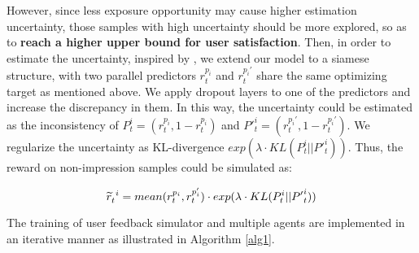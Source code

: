 However, since less exposure opportunity may cause higher estimation uncertainty, those samples with high uncertainty should be more explored, so as to \textbf{reach a higher upper bound for user satisfaction}. 
Then, in order to estimate the uncertainty, inspired by \cite{rnd2018}, we extend our model to a siamese structure, with two parallel predictors $r_t^{p_i}$ and $r_t^{p_i'}$ share the same optimizing target as mentioned above. We apply dropout layers to one of the predictors and increase the discrepancy in them. In this way, the uncertainty could be estimated as the inconsistency of $P_{t}^i = (r_t^{p_i}, 1- r_t^{p_i})$ and ${P'}_{t}^i = (r_t^{p_i'}, 1-r_t^{p_i'})$. We regularize the uncertainty as KL-divergence $exp(\lambda \cdot KL(P_{t}^i||{P'}_{t}^i))$. Thus, the reward on non-impression samples could be simulated as:



\vspace{-1.0em}
\begin{small}
\begin{equation} \label{eq6}
\setlength{\abovedisplayskip}{1pt}
\widetilde{r}_t^{\ i} = mean(r_t^{p_i}, r_t^{p_i'}) \cdot exp(\lambda \cdot KL(P_{t}^i||{P'}_{t}^i))
\setlength{\belowdisplayskip}{1pt}
\end{equation}
\end{small}
The training of user feedback simulator and multiple agents are implemented in an  iterative manner as illustrated in Algorithm \ref{alg1}.





